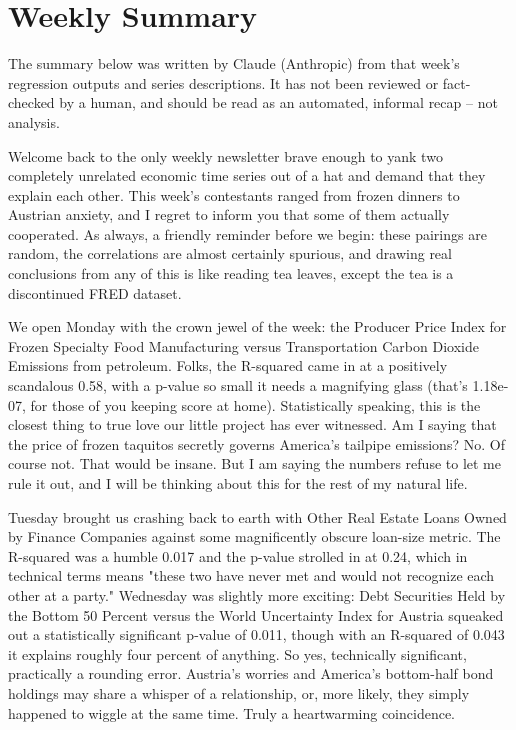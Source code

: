 \section{Weekly Summary}

\begin{tcolorbox}[colback=yellow!10,colframe=black!50,title=AI-Generated Content]
\noindent The summary below was written by Claude (Anthropic) from that week's regression outputs and series descriptions. It has not been reviewed or fact-checked by a human, and should be read as an automated, informal recap -- not analysis.
\end{tcolorbox}

Welcome back to the only weekly newsletter brave enough to yank two completely unrelated economic time series out of a hat and demand that they explain each other. This week's contestants ranged from frozen dinners to Austrian anxiety, and I regret to inform you that some of them actually cooperated. As always, a friendly reminder before we begin: these pairings are random, the correlations are almost certainly spurious, and drawing real conclusions from any of this is like reading tea leaves, except the tea is a discontinued FRED dataset.

We open Monday with the crown jewel of the week: the Producer Price Index for Frozen Specialty Food Manufacturing versus Transportation Carbon Dioxide Emissions from petroleum. Folks, the R-squared came in at a positively scandalous 0.58, with a p-value so small it needs a magnifying glass (that's 1.18e-07, for those of you keeping score at home). Statistically speaking, this is the closest thing to true love our little project has ever witnessed. Am I saying that the price of frozen taquitos secretly governs America's tailpipe emissions? No. Of course not. That would be insane. But I am saying the numbers refuse to let me rule it out, and I will be thinking about this for the rest of my natural life.

Tuesday brought us crashing back to earth with Other Real Estate Loans Owned by Finance Companies against some magnificently obscure loan-size metric. The R-squared was a humble 0.017 and the p-value strolled in at 0.24, which in technical terms means "these two have never met and would not recognize each other at a party." Wednesday was slightly more exciting: Debt Securities Held by the Bottom 50 Percent versus the World Uncertainty Index for Austria squeaked out a statistically significant p-value of 0.011, though with an R-squared of 0.043 it explains roughly four percent of anything. So yes, technically significant, practically a rounding error. Austria's worries and America's bottom-half bond holdings may share a whisper of a relationship, or, more likely, they simply happened to wiggle at the same time. Truly a heartwarming coincidence.

